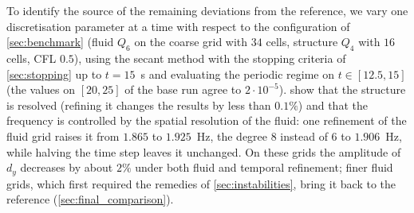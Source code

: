 \documentclass[11pt,a4paper]{article}
\theoremstyle{definition}
\theoremstyle{remark}
\begin{document}
To identify the source of the remaining deviations from the reference, we vary one discretisation
parameter at a time with respect to the configuration of \cref{sec:benchmark} (fluid $Q_6$ on the
coarse grid with $34$ cells, structure $Q_4$ with $16$ cells, CFL $0.5$), using the secant method
with the stopping criteria of \cref{sec:stopping} up to $t=15$~s and evaluating the periodic
regime on $t\in[12.5,15]$ (the values on $[20,25]$ of the base run agree to $2\cdot10^{-5}$).
 show that the structure is resolved (refining it changes the
results by less than $0.1\%$) and that the frequency is controlled by the spatial resolution of
the fluid: one refinement of the fluid grid raises it from $1.865$ to $1.925$~Hz, the degree $8$
instead of $6$ to $1.906$~Hz, while halving the time step leaves it unchanged. On these grids the amplitude of $d_y$
decreases by about $2\%$ under both fluid and temporal refinement; finer fluid grids, which first
required the remedies of \cref{sec:instabilities}, bring it back to the reference
(\cref{sec:final_comparison}).

\begin{table}[ht]\centering
\caption{Resolution study, periodic regime $t\in[12.5,15]$: mean $\pm$ amplitude
[frequency] of the tip displacement. $N_u$ is the number of velocity degrees of freedom of the
fluid; $\Delta t$ relative to the base run.}\label{tab:resolution}
\end{table}
\end{document}
